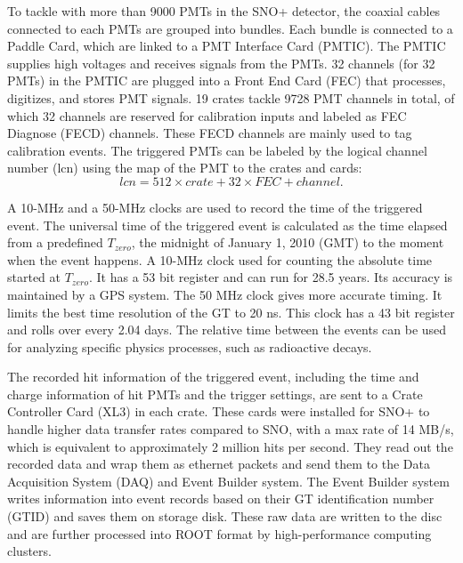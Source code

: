 To tackle with more than 9000 PMTs in the SNO+ detector, the coaxial cables connected to each PMTs are grouped into bundles. Each bundle is connected to a Paddle Card, which are linked to a PMT Interface Card (PMTIC). The PMTIC supplies high voltages and receives signals from the PMTs. 32 channels (for 32 PMTs) in the PMTIC are plugged into a Front End Card (FEC) that processes, digitizes, and stores PMT signals. 19 crates tackle 9728 PMT channels in total, of which 32 channels are reserved for calibration inputs and labeled as FEC Diagnose (FECD) channels. These FECD channels are mainly used to tag calibration events. The triggered PMTs can be labeled by the logical channel number (lcn) using the map of the PMT to the crates and cards\cite{snop_jinst,stringer2019sensitivity}:
\begin{equation}
lcn = 512 \times crate + 32 \times FEC + channel.
\end{equation}

A 10-MHz and a 50-MHz clocks are used to record the time of the triggered event. The universal time of the triggered event is calculated as the time elapsed from a predefined $T_{zero}$, the midnight of January 1, 2010 (GMT) to the moment when the event happens. A 10-MHz clock used for counting the absolute time started at $T_{zero}$. It has a 53 bit register and can run for 28.5 years. Its accuracy is maintained by a GPS system. The 50 MHz clock gives more accurate timing. It limits the best time resolution of the GT to 20 ns. This clock has a 43 bit register and rolls over every 2.04 days. The relative time between the events can be used for analyzing specific physics processes, such as radioactive decays\cite{rattime,stringer2019sensitivity}. 

The recorded hit information of the triggered event, including the time and charge information of hit PMTs and the trigger settings, are sent to a Crate Controller Card (XL3) in each crate. These cards were installed for SNO+ to handle higher data transfer rates compared to SNO, with a max rate of 14 MB/s, which is equivalent to approximately 2 million hits per second\cite{bonventre2014neutron}. They read out the recorded data and wrap them as ethernet packets and send them to the Data Acquisition System (DAQ) and Event Builder system\cite{walker2016study}. The Event Builder system writes information into event records based on their GT identification number (GTID) and saves them on storage disk\cite{snop_jinst}. These raw data are written to the disc and are further processed into ROOT format by high-performance computing clusters.


